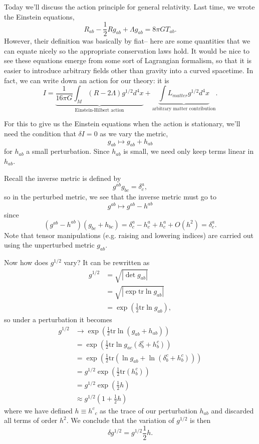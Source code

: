 Today we'll discuss the action principle for general relativity. Last time, we wrote the Einstein equations,
$$R_{ab}-\frac{1}{2}Rg_{ab}+\Lambda g_{ab}=8\pi GT_{ab}.$$
%
However, their definition was basically by fiat-- here are some quantities that we can equate nicely so the appropriate conservation laws hold. It would be nice to see these equations emerge from some sort of Lagrangian formalism, so that it is easier to introduce arbitrary fields other than gravity into a curved spacetime. In fact, we can write down an action for our theory: it is
$$I=\underbrace{\frac{1}{16\pi G}\int_M (R-2\Lambda)g^{1/2}d^4x}_{\text{Einstein-Hilbert action}} + \underbrace{\int L_{matter} g^{1/2}d^4x}_{\text{arbitrary matter contribution}}.$$

For this to give us the Einstein equations when the action is stationary, we'll need the condition that $\delta I=0$ as we vary the metric,
$$g_{ab}\mapsto g_{ab}+h_{ab}$$ for $h_{ab}$ a small perturbation. Since $h_{ab}$ is small, we need only keep terms linear in $h_{ab}$. 

Recall the inverse metric is defined by
$$g^{ab} g_{bc}=\delta^a_c,$$ %
so in the perturbed metric, we see that the inverse metric must go to 
$$g^{ab}\mapsto g^{ab}-h^{ab}$$ since
$$(g^{ab}-h^{ab})(g_{bc}+h_{bc})=\delta^a_c -h^a_c+h^a_c+O(h^2)=\delta^a_c.$$
Note that tensor manipulations (e.g. raising and lowering indices) are carried out using the unperturbed metric $g_{ab}$.

Now how does $g^{1/2}$ vary? It can be rewritten as
\begin{align*}
    g^{1/2}&= \sqrt{|\det g_{ab}|}\\
    &=\sqrt{|\exp \text{tr}\ln g_{ab}|}\\
    &=\exp \left(\frac{1}{2} \text{tr}\ln g_{ab}\right),
\end{align*}
so under a perturbation it becomes
\begin{align*}
g^{1/2}&\to \exp \left(\frac{1}{2}\text{tr}\ln (g_{ab}+h_{ab})\right)\\
&=\exp \left(\frac{1}{2} \text{tr} \ln g_{ac} (\delta^c_b + h^c_b)\right)\\
&=\exp \left(\frac{1}{2}\text{tr}(\ln g_{ab}+\ln (\delta^c_b +h^c_b))\right)\\
&= g^{1/2} \exp \left(\frac{1}{2} \text{tr}(h^c_b)\right)\\
&=g^{1/2} \exp \left(\frac{1}{2} h\right)\\
&\approx g^{1/2} \left(1+\frac{1}{2}h\right)
\end{align*}
where we have defined $h\equiv h^c{}_c$ as the trace of our perturbation $h_{ab}$ and discarded all terms of order $h^2$. We conclude that the variation of $g^{1/2}$ is then
$$\delta g^{1/2}=g^{1/2}\frac{1}{2}h.$$


